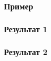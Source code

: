 \documentclass{beamer}
\begin{document}
\begin{frame}
\frametitle{Пример}
\end{frame}

\begin{frame}
\frametitle{Результат 1}
\end{frame}

\begin{frame}
\frametitle{Результат 2}
\end{frame}
\end{document}
